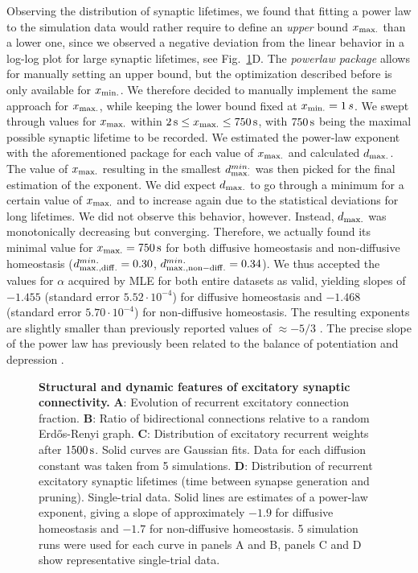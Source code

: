 \documentclass[10pt,letterpaper]{article}
\begin{document}
Observing the distribution of synaptic lifetimes, we found that fitting a power law to the simulation data would rather require to define an \emph{upper} bound $x_{\rm max.}$ than a lower one, since we observed a negative deviation from the linear behavior in a log-log plot for large synaptic lifetimes, see Fig.~\ref{Syn_Topology_Features}D. The \textit{powerlaw package} allows for manually setting an upper bound, but the optimization described before is only available for $x_{\rm min.}$. We therefore decided to manually implement the same approach for $x_{\rm max.}$, while keeping the lower bound fixed at $x_{\rm min.} = 1 \, s$.
We swept through values for $x_{\rm max.}$ within $\mathrm{2\,s} \leq x_{\rm max.} \leq \mathrm{750\,s}$, with $\rm 750 \, s$ being the maximal possible synaptic lifetime to be recorded. We estimated the power-law exponent with the aforementioned package for each value of $x_{\rm max.}$ and calculated $d_{\rm max.}$. The value of $x_{\rm max.}$ resulting in the smallest $d_{\rm max.}^{min.}$ was then picked for the final estimation of the exponent. We did expect $d_{\rm max.}$ to go through a minimum for a certain value of $x_{\rm max.}$ and to increase again due to the statistical deviations for long lifetimes. We did not observe this behavior, however. Instead, $d_{\rm max.}$ was monotonically decreasing but converging. Therefore, we actually found its minimal value for $x_{\rm max.} = \rm 750 \, s$ for both diffusive homeostasis and non-diffusive homeostasis ($d_{\rm max.,diff.}^{min.} = 0.30$, $d_{\rm max.,non-diff.}^{min.} = 0.34$). We thus accepted the values for $\alpha$ acquired by MLE for both entire datasets as valid, yielding slopes of $-1.455$ (standard error $5.52\cdot 10^{-4}$) for diffusive homeostasis and $-1.468$ (standard error $5.70\cdot 10^{-4}$) for non-diffusive homeostasis. The resulting exponents are slightly smaller than previously reported values of $\mathrm{\approx - 5/3}$ \cite{SORN_Paper}. The precise slope of the power law has previously been related to the balance of potentiation and depression \cite{SORN_Paper}.

\begin{figure}
\begin{center}
\end{center}
\caption{{\bf Structural and dynamic features of excitatory synaptic connectivity.} \textbf{A}: Evolution of recurrent excitatory connection fraction. \textbf{B}: Ratio of bidirectional connections relative to a random Erd\H{o}s-Renyi graph. \textbf{C}: Distribution of excitatory recurrent weights after $\rm 1500\, s$. Solid curves are Gaussian fits. Data for each diffusion constant was taken from 5 simulations. \textbf{D}: Distribution of recurrent excitatory synaptic lifetimes (time between synapse generation and pruning). Single-trial data. Solid lines are estimates of a power-law exponent, giving a slope of approximately $\mathrm{-1.9}$ for diffusive homeostasis and $\mathrm{-1.7}$ for non-diffusive homeostasis. 5 simulation runs were used for each curve in panels A and B, panels C and D show representative single-trial data.}
\label{Syn_Topology_Features}
\end{figure}
\end{document}
